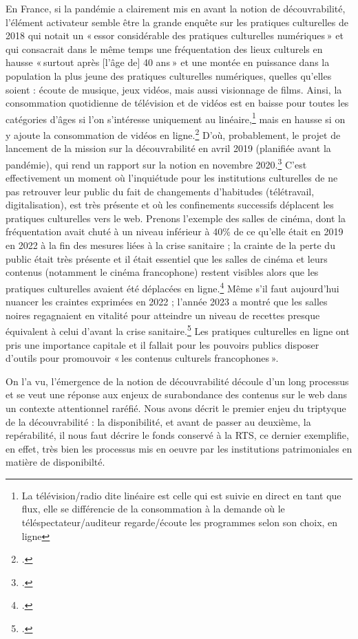 En France, si la pandémie a clairement mis en avant la notion de découvrabilité, l’élément activateur semble être la grande enquête sur les pratiques culturelles de 2018 qui notait un « essor considérable des pratiques culturelles numériques » et qui consacrait dans le même temps une fréquentation des lieux culturels en hausse « surtout après [l’âge de] 40 ans » et une montée en puissance dans la population la plus jeune des pratiques culturelles numériques, quelles qu’elles soient : écoute de musique, jeux vidéos, mais aussi visionnage de films. Ainsi, la consommation quotidienne de télévision et de vidéos est en baisse pour toutes les catégories d’âges si l’on s’intéresse uniquement au linéaire,\footnote{La télévision/radio dite linéaire est celle qui est suivie en direct en tant que flux, elle se différencie de la consommation à la demande où le téléspectateur/auditeur regarde/écoute les programmes selon son choix, en ligne} mais en hausse si on y ajoute la consommation de vidéos en ligne.\footcite[p. 24]{2020b} D’où, probablement, le projet de lancement de la mission sur la découvrabilité en avril 2019 (planifiée avant la pandémie), qui rend un rapport sur la notion en novembre 2020.\footcite{zotero-263} C’est effectivement un moment où l’inquiétude pour les institutions culturelles de ne pas retrouver leur public du fait de changements d’habitudes (télétravail, digitalisation), est très présente et où les confinements successifs déplacent les pratiques culturelles vers le web. Prenons l’exemple des salles de cinéma, dont la fréquentation avait chuté à un niveau inférieur à 40\% de ce qu’elle était en 2019 en 2022 à la fin des mesures liées à la crise sanitaire ; la crainte de la perte du public était très présente et il était essentiel que les salles de cinéma et leurs contenus (notamment le cinéma francophone) restent visibles alors que les pratiques culturelles avaient été déplacées en ligne.\footcite[§1 et §2]{muller2022} Même s’il faut aujourd’hui nuancer les craintes exprimées en 2022 ; l’année 2023 a montré que les salles noires regagnaient en vitalité pour atteindre un niveau de recettes presque équivalent à celui d’avant la crise sanitaire.\footcite{2024m} Les pratiques culturelles en ligne ont pris une importance capitale et il fallait pour les pouvoirs publics disposer d’outils pour promouvoir « les contenus culturels francophones ».

On l’a vu, l’émergence de la notion de découvrabilité découle d’un long processus et se veut une réponse aux enjeux de surabondance des contenus sur le web dans un contexte attentionnel raréfié. Nous avons décrit le premier enjeu du triptyque de la découvrabilité : la disponibilité, et avant de passer au deuxième, la repérabilité, il nous faut décrire le fonds conservé à la RTS, ce dernier exemplifie, en effet, très bien les processus mis en oeuvre par les institutions patrimoniales en matière de disponibilté. 

